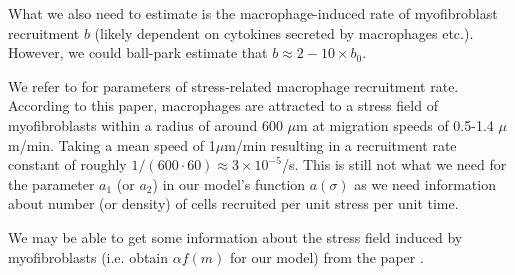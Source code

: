 What we also need to estimate is the macrophage-induced rate of myofibroblast recruitment $b$ (likely dependent on cytokines secreted by macrophages etc.). However, we could ball-park estimate that $b \approx 2-10 \times b_0$. 

We refer to \cite{pakshir2019dynamic} for parameters of stress-related macrophage recruitment rate. According to this paper, macrophages are attracted to a stress field of myofibroblasts within a radius of around 600 $\mu$m at migration speeds of 0.5-1.4 $\mu$m/min. Taking a mean speed of 1$\mu$m/min resulting in a recruitment rate constant of roughly $1/(600\cdot 60)\approx 3 \times 10^{-5} $/s. This is still not what we need for the parameter $a_1$ (or $a_2$)  in our model's function $a(\sigma)$ as we need information about number (or density) of cells recruited per unit stress per unit time. 

We may be able to get some information about the stress field induced by myofibroblasts (i.e. obtain $\alpha f(m)$ for our model) from the paper \cite{pakshir2019dynamic}.


